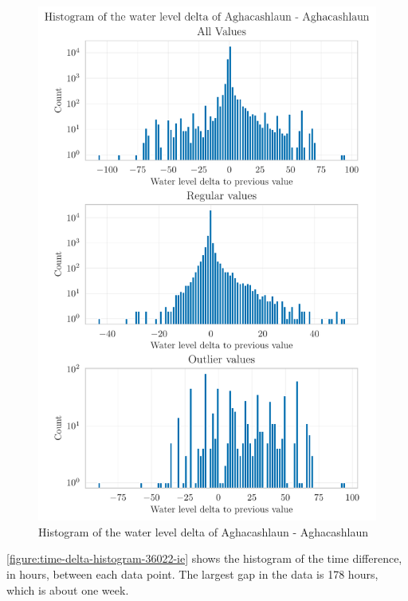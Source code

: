 \begin{figure}[htp]
    \centering
    \includegraphics{./plots/pdfs/36022-ie/water_level_delta_histogram_36022-ie.pdf}
    \caption{Histogram of the water level delta of Aghacashlaun - Aghacashlaun}
    \label{figure:water-level-delta-histogram-36022-ie}
\end{figure}
\newline
\autoref{figure:time-delta-histogram-36022-ie} shows the histogram of the time difference, in hours, between each data point. The largest gap in the data is 178 hours, which is about one week.
